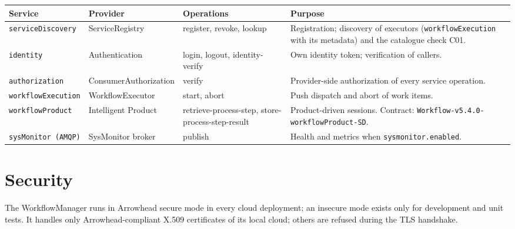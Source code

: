\documentclass[a4paper]{arrowhead}
\begin{document}
{\small
\begin{longtable}{|p{3.4cm}|p{3.2cm}|p{3.6cm}|p{5.6cm}|}

\hline
\rowcolor{gray!33} Service & Provider & Operations & Purpose \\ \hline
\endhead
\texttt{serviceDiscovery} & ServiceRegistry & register, revoke, lookup & Registration; discovery of executors (\texttt{workflowExecution} with its metadata) and the catalogue check C01. \\ \hline
\texttt{identity} & Authentication & login, logout, identity-verify & Own identity token; verification of callers. \\ \hline
\texttt{authorization} & ConsumerAuthorization & verify & Provider-side authorization of every service operation. \\ \hline
\texttt{workflowExecution} & WorkflowExecutor & start, abort & Push dispatch and abort of work items. \\ \hline
\texttt{workflowProduct} & Intelligent Product & retrieve-process-step, store-process-step-result & Product-driven sessions. Contract: \texttt{Workflow-v5.4.0-workflowProduct-SD}. \\ \hline
\texttt{sysMonitor (AMQP)} & SysMonitor broker & publish & Health and metrics when \texttt{sysmonitor.enabled}. \\ \hline
\end{longtable}
}


\newpage
\section{Security}
\label{sec:security}
The WorkflowManager runs in Arrowhead secure mode in every cloud deployment; an insecure mode exists only for development and
unit tests. It handles only Arrowhead-compliant X.509 certificates of its local cloud; others are refused during the
TLS handshake.
\end{document}
